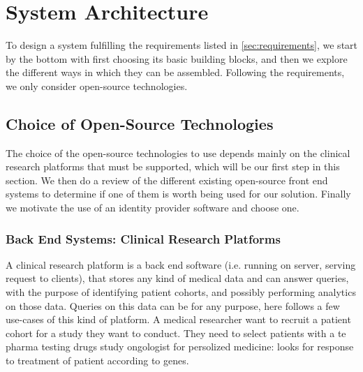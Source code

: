 \chapter{System Architecture}
\label{sec:sysarchitecture}

To design a system fulfilling the requirements listed in \ref{sec:requirements}, we start by the bottom with first choosing its basic building blocks, and then we explore the different ways in which they can be assembled.
Following the requirements, we only consider open-source technologies.


\section{Choice of Open-Source Technologies}

The choice of the open-source technologies to use depends mainly on the clinical research platforms that must be supported, which will be our first step in this section.
We then do a review of the different existing open-source front end systems to determine if one of them is worth being used for our solution.
Finally we motivate the use of an identity provider software and choose one.

\subsection{Back End Systems: Clinical Research Platforms}

A clinical research platform is a back end software (i.e. running on server, serving request to clients), that stores any kind of medical data and can answer queries, with the purpose of identifying patient cohorts, and possibly performing analytics on those data.
Queries on this data can be for any purpose, here follows a few use-cases of this kind of platform.
A medical researcher want to recruit a patient cohort for a study they want to conduct. They need to select patients with a te
pharma testing drugs study
ongologist for persolized medicine: looks for response to treatment of patient according to genes.



